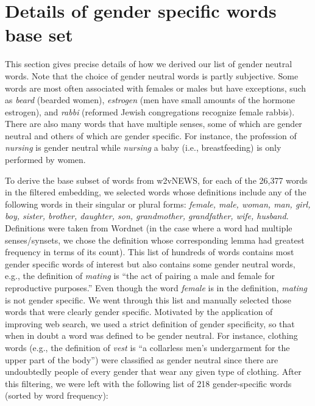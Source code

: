 \documentclass{article}
\begin{document}
\section{Details of gender specific words base set}\label{ap:gender_neutral}
This section gives precise details of how we derived our list of gender neutral words. Note that the choice of gender neutral words is partly subjective. Some words are most often associated with females or males but have exceptions, such as {\em beard} (bearded women), {\em estrogen} (men have small amounts of the hormone estrogen), and {\em rabbi} (reformed Jewish congregations recognize female rabbis). There are also many words that have multiple senses, some of which are gender neutral and others of which are gender specific. For instance, the profession of {\em nursing} is gender neutral while {\em nursing} a baby (i.e., breastfeeding) is only performed by women. 

To derive the base subset of words from w2vNEWS, for each of the 26,377 words in the filtered embedding, we selected words whose definitions include any of the following words in their singular or plural forms: {\em female, male, woman, man, girl, boy, sister, brother, daughter, son, grandmother, grandfather, wife, husband}. Definitions were taken from Wordnet \cite{fellbaum98} (in the case where a word had multiple senses/synsets, we chose the definition whose corresponding lemma had greatest frequency in terms of its count). This list of hundreds of words contains most gender specific words of interest but also contains some gender neutral words, e.g., the definition of {\em mating} is ``the act of pairing a male and female for reproductive purposes.'' Even though the word {\em female} is in the definition, {\em mating} is not gender specific. We went through this list and manually selected those words that were clearly gender specific. Motivated by the application of improving web search, we used a strict definition of gender specificity, so that when in doubt a word was defined to be gender neutral. For instance, clothing words (e.g., the definition of {\em vest} is ``a collarless men's undergarment for the upper part of the body'') were classified as gender neutral since there are undoubtedly people of every gender that wear any given type of clothing. After this filtering, we were left with the following list of 218 gender-specific words (sorted by word frequency):
\end{document}
